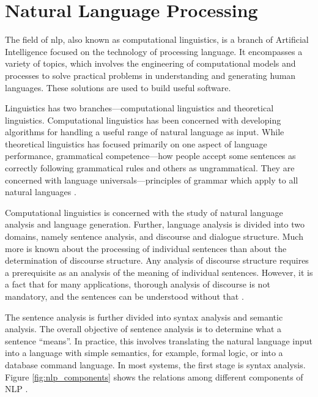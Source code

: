 \section{Natural Language Processing}\label{sec:nlp}

The field of \gls{nlp}, also known as computational linguistics, is a branch of Artificial Intelligence focused on the technology of processing language.
It encompasses a variety of topics, which involves the engineering of computational models and
processes to solve practical problems in understanding and generating human
languages. These solutions are used to build useful software.

Linguistics has two
branches---computational linguistics and theoretical linguistics. Computational
linguistics has been concerned with developing algorithms for handling a useful
range of natural language as input. While theoretical linguistics has focused
primarily on one aspect of language performance, grammatical competence---how
people accept some sentences as correctly following grammatical rules and others as ungrammatical. They are concerned with language universals—principles of
grammar which apply to all natural languages \cite{Cole:1996}.

Computational linguistics is concerned with the study of natural language analysis
and language generation. Further, language analysis is divided into two domains,
namely sentence analysis, and discourse and dialogue structure. Much more is known
about the processing of individual sentences than about the determination of discourse
structure. Any analysis of discourse structure requires a prerequisite as an analysis of
the meaning of individual sentences. However, it is a fact that for many applications,
thorough analysis of discourse is not mandatory, and the sentences can be understood
without that \cite{grishman_computational_1986}.

The sentence analysis is further divided into syntax analysis and semantic analysis.
The overall objective of sentence analysis is to determine what a sentence “means”.
In practice, this involves translating the natural language input into a language with
simple semantics, for example, formal logic, or into a database command language.
In most systems, the first stage is syntax analysis. Figure \ref*{fig:nlp_components} shows the relations
among different components of NLP \cite{Chowdhary2020}.

